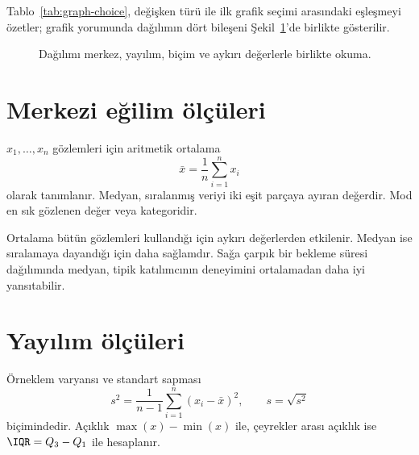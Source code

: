 Tablo~\ref{tab:graph-choice}, değişken türü ile ilk grafik seçimi arasındaki
eşleşmeyi özetler; grafik yorumunda dağılımın dört bileşeni
Şekil~\ref{fig:distribution-reading}'de birlikte gösterilir.

\begin{figure}[H]
\centering
{}
\caption{Dağılımı merkez, yayılım, biçim ve aykırı değerlerle birlikte okuma.}
\label{fig:distribution-reading}
\end{figure}

\section{Merkezi eğilim ölçüleri}
\label{sec:descriptive-center}

$x_1,\ldots,x_n$ gözlemleri için aritmetik ortalama
\[
\bar{x}=\frac{1}{n}\sum_{i=1}^{n}x_i
\]
olarak tanımlanır. Medyan, sıralanmış veriyi iki eşit parçaya ayıran değerdir.
Mod en sık gözlenen değer veya kategoridir.

Ortalama bütün gözlemleri kullandığı için aykırı değerlerden etkilenir. Medyan
ise sıralamaya dayandığı için daha sağlamdır. Sağa çarpık bir bekleme süresi
dağılımında medyan, tipik katılımcının deneyimini ortalamadan daha iyi
yansıtabilir.

\section{Yayılım ölçüleri}
\label{sec:descriptive-spread}

Örneklem varyansı ve standart sapması
\[
s^2=\frac{1}{n-1}\sum_{i=1}^{n}(x_i-\bar{x})^2,
\qquad s=\sqrt{s^2}
\]
biçimindedir. Açıklık $\max(x)-\min(x)$ ile, çeyrekler arası açıklık ise
$\IQR=Q_3-Q_1$ ile hesaplanır.

